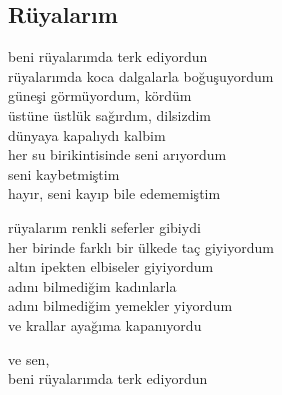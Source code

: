\subsection{Rüyalarım}

beni rüyalarımda terk ediyordun \\
rüyalarımda koca dalgalarla boğuşuyordum \\
güneşi görmüyordum, kördüm \\
üstüne üstlük sağırdım, dilsizdim \\
dünyaya kapalıydı kalbim \\
her su birikintisinde seni arıyordum \\
seni kaybetmiştim \\
hayır, seni kayıp bile edememiştim

\noindent\newline
rüyalarım renkli seferler gibiydi \\
her birinde farklı bir ülkede taç giyiyordum \\
altın ipekten elbiseler giyiyordum \\
adını bilmediğim kadınlarla \\
adını bilmediğim yemekler yiyordum \\
ve krallar ayağıma kapanıyordu

\noindent\newline
ve sen, \\
beni rüyalarımda terk ediyordun